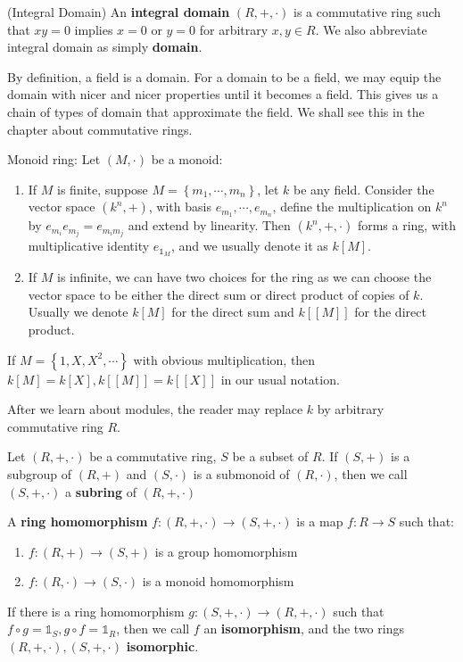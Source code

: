 \documentclass{note-eng}
\begin{document}
\begin{definition}
    (Integral Domain) An \textbf{integral domain} $(R, +, \cdot)$ is a commutative ring such that $xy = 0$ implies $x = 0$ or $y = 0$ for arbitrary $x, y \in R$. We also abbreviate integral domain as simply \textbf{domain}.
\end{definition}

By definition, a field is a domain. For a domain to be a field, we may equip the domain with nicer and nicer properties until it becomes a field. This gives us a chain of types of domain that approximate the field. We shall see this in the chapter about commutative rings.
\fi

\begin{example}
    Monoid ring: Let $(M, \cdot)$ be a monoid:
    \begin{enumerate}
        \item If $M$ is finite, suppose $M = \left\lbrace m_1, \cdots, m_n \right\rbrace$, let $k$ be any field. Consider the vector space $(k^n, +)$, with basis $e_{m_1}, \cdots, e_{m_n}$, define the multiplication on $k^n$ by $e_{m_i} e_{m_j} = e_{m_im_j}$ and extend by linearity. Then $(k^n, +, \cdot)$ forms a ring, with multiplicative identity $e_{\mathds{1}_M}$, and we usually denote it as $k[M]$.
        \item If $M$ is infinite, we can have two choices for the ring as we can choose the vector space to be either the direct sum or direct product of copies of $k$. Usually we denote $k[M]$ for the direct sum and $k[[M]]$ for the direct product.
    \end{enumerate}
    If $M = \left\lbrace 1, X, X^2, \cdots \right\rbrace$ with obvious multiplication, then $k[M] = k[X], k[[M]] = k[[X]]$ in our usual notation.

    After we learn about modules, the reader may replace $k$ by arbitrary commutative ring $R$.
\end{example}

\begin{definition}[Subring]
    Let $(R, +, \cdot)$ be a commutative ring, $S$ be a subset of $R$. If $(S, +)$ is a subgroup of $(R, +)$ and $(S, \cdot)$ is a submonoid of $(R, \cdot)$, then we call $(S, +, \cdot)$ a \textbf{subring} of $(R, +, \cdot)$
\end{definition}

\begin{definition}
    A \textbf{ring homomorphism} $f: (R, +, \cdot) \rightarrow (S, +, \cdot)$ is a map $f: R \rightarrow S$ such that:
    \begin{enumerate}
        \item $f: (R, +) \rightarrow (S, +)$ is a group homomorphism
        \item $f: (R, \cdot) \rightarrow (S, \cdot)$ is a monoid homomorphism
    \end{enumerate}

    If there is a ring homomorphism $g: (S, +, \cdot) \rightarrow (R, +, \cdot)$ such that $f \circ g = \mathds{1}_S, g \circ f = \mathds{1}_R$, then we call $f$ an \textbf{isomorphism}, and the two rings $(R, +, \cdot), (S, +, \cdot)$ \textbf{isomorphic}.
\end{definition}
\end{document}
